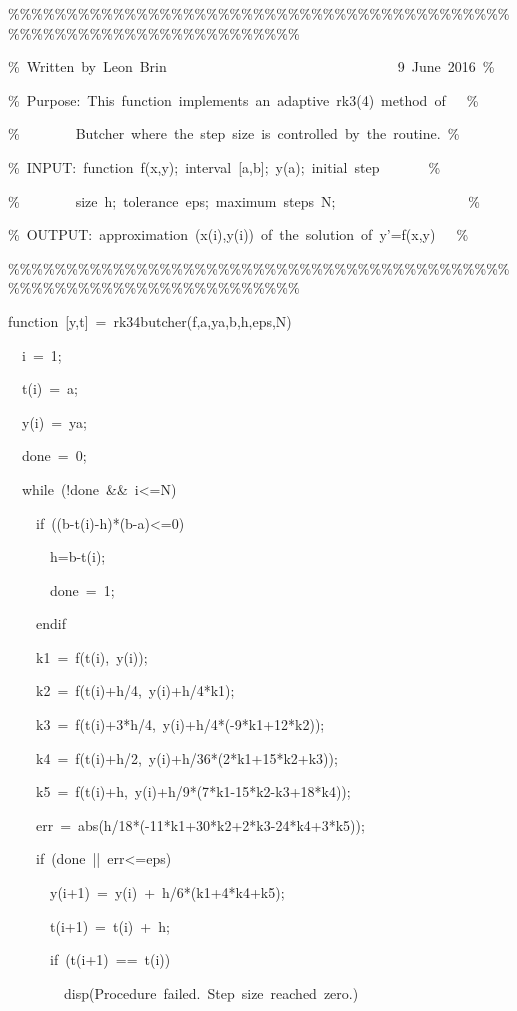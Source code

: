 \begin{description}
\begin{lyxcode}
\%\%\%\%\%\%\%\%\%\%\%\%\%\%\%\%\%\%\%\%\%\%\%\%\%\%\%\%\%\%\%\%\%\%\%\%\%\%\%\%\%\%\%\%\%\%\%\%\%\%\%\%\%\%\%\%\%\%\%\%\%\%\%\%\%\%\%\%

\%~Written~by~Leon~Brin~~~~~~~~~~~~~~~~~~~~~~~~~~~~~~~~~9~June~2016~\%

\%~Purpose:~This~function~implements~an~adaptive~rk3(4)~method~of~~~\%

\%~~~~~~~~Butcher~where~the~step~size~is~controlled~by~the~routine.~\%

\%~INPUT:~function~f(x,y);~interval~{[}a,b{]};~y(a);~initial~step~~~~~~~\%

\%~~~~~~~~size~h;~tolerance~eps;~maximum~steps~N;~~~~~~~~~~~~~~~~~~~\%

\%~OUTPUT:~approximation~(x(i),y(i))~of~the~solution~of~y'=f(x,y)~~~\%

\%\%\%\%\%\%\%\%\%\%\%\%\%\%\%\%\%\%\%\%\%\%\%\%\%\%\%\%\%\%\%\%\%\%\%\%\%\%\%\%\%\%\%\%\%\%\%\%\%\%\%\%\%\%\%\%\%\%\%\%\%\%\%\%\%\%\%\%

function~{[}y,t{]}~=~rk34butcher(f,a,ya,b,h,eps,N)

~~i~=~1;

~~t(i)~=~a;

~~y(i)~=~ya;

~~done~=~0;

~~while~(!done~\&\&~i<=N)

~~~~if~((b-t(i)-h){*}(b-a)<=0)

~~~~~~h=b-t(i);

~~~~~~done~=~1;

~~~~endif

~~~~k1~=~f(t(i),~y(i));

~~~~k2~=~f(t(i)+h/4,~y(i)+h/4{*}k1);

~~~~k3~=~f(t(i)+3{*}h/4,~y(i)+h/4{*}(-9{*}k1+12{*}k2));

~~~~k4~=~f(t(i)+h/2,~y(i)+h/36{*}(2{*}k1+15{*}k2+k3));

~~~~k5~=~f(t(i)+h,~y(i)+h/9{*}(7{*}k1-15{*}k2-k3+18{*}k4));

~~~~err~=~abs(h/18{*}(-11{*}k1+30{*}k2+2{*}k3-24{*}k4+3{*}k5));

~~~~if~(done~||~err<=eps)

~~~~~~y(i+1)~=~y(i)~+~h/6{*}(k1+4{*}k4+k5);

~~~~~~t(i+1)~=~t(i)~+~h;

~~~~~~if~(t(i+1)~==~t(i))

~~~~~~~~disp(\textquotedbl Procedure~failed.~Step~size~reached~zero.\textquotedbl )


\end{lyxcode}
\end{description}
